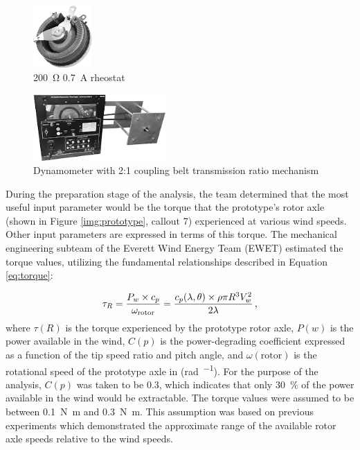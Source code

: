 \documentclass[11pt,letterpaper,conference]{IEEEtran}
\begin{document}
\begin{figure}[th]
    \centering
    \includegraphics[width=0.2\textwidth]{images/rheostat.png}
    \caption{\qty{200}{\ohm} \qty{0.7}{\A} rheostat}
    \label{img:rheostat}
\end{figure}
\begin{figure}[th]
    \centering
    \includegraphics[width=0.45\textwidth]{images/dyno.png}
    \caption{Dynamometer with 2:1 coupling belt transmission ratio mechanism}
    \label{img:dyno}
\end{figure}

During the preparation stage of the analysis, the team determined that the
most useful input parameter would be the torque that the prototype's rotor axle
(shown in Figure \ref{img:prototype}, callout 7) experienced at various wind
speeds. Other input parameters are expressed in terms of this torque. The
mechanical engineering subteam of the Everett Wind Energy Team (EWET)
estimated the torque values, utilizing the fundamental relationships described
in Equation \eqref{eq:torque}:

\begin{equation}
    \label{eq:torque}
    \tau_R = \frac{P_w \times c_p}{\omega_\text{rotor}}
    = \frac{c_p(\lambda, \theta) \times \rho \pi R^3 V_w^2}{2\lambda}
    \text{\,,}
\end{equation}
where $\tau(R)$ is the torque experienced by the prototype rotor axle,
$P(w)$ is the power available in the wind, $C(p)$ is the power-degrading
coefficient expressed as a function of the tip speed ratio and pitch angle,
and $\omega(\text{rotor})$ is the rotational speed of the prototype axle in
(\unit{\radian\per\sec}). For the purpose of the analysis, $C(p)$ was taken to
be \num{0.3}, which indicates that only \qty{30}{\percent} of the power
available in the wind would be extractable. The torque values were assumed to
be between \qty{.1}{\newton\m} and \qty{.3}{\newton\m}. This assumption was
based on previous experiments which demonstrated the approximate range of the
available rotor axle speeds relative to the wind speeds.
\end{document}
